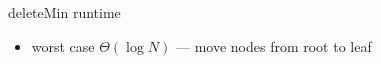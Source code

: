 \begin{frame}{deleteMin runtime}
\begin{itemize}
\item worst case $\Theta(\log N)$ --- move nodes from root to leaf
\end{itemize}
\end{frame}
